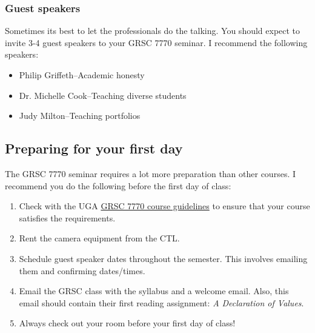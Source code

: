 \subsubsection{Guest speakers}
\label{sec:guest-speakers}

Sometimes its best to let the professionals do the talking.  You should expect to invite 3-4 guest speakers to your GRSC 7770 seminar.  I recommend the following speakers:
\begin{itemize}
\item Philip Griffeth--Academic honesty
\item Dr. Michelle Cook--Teaching diverse students
\item Judy Milton--Teaching portfolios
\end{itemize}



\subsection{Preparing for your first day}
\label{sec:preparing-your-first}

The GRSC 7770 seminar requires a lot more preparation than other courses.  I recommend you do the following before the first day of class:

\begin{enumerate}
\item Check with the UGA \href{}{GRSC 7770 course guidelines} to ensure that your course satisfies the requirements.
\item Rent the camera equipment from the CTL.
\item Schedule guest speaker dates throughout the semester.  This involves emailing them and confirming dates/times.
\item Email the GRSC class with the syllabus and a welcome email.  Also, this email should contain their first reading assignment: \emph{A Declaration of Values}. 
\item Always check out your room before your first day of class! 
\end{enumerate}


